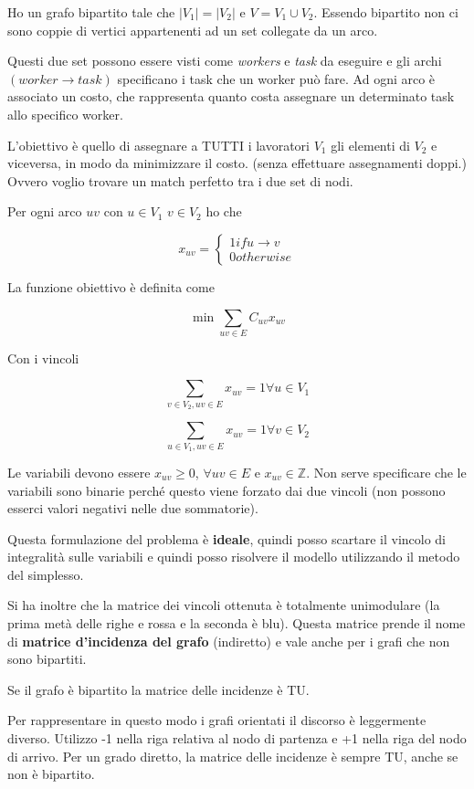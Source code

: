 Ho un grafo bipartito tale che $|V_1| = |V_2|$ e $V = V_1 \cup V_2$. Essendo bipartito non ci sono coppie di vertici appartenenti ad un set collegate da un arco.

Questi due set possono essere visti come \textit{workers} e \textit{task} da eseguire e gli archi $(worker \to task)$ specificano i task che un worker può fare. Ad ogni arco è associato un costo, che rappresenta quanto costa assegnare un determinato task allo specifico worker.

L'obiettivo è quello di assegnare a TUTTI i lavoratori $V_1$ gli elementi di $V_2$  e viceversa, in modo da minimizzare il costo. (senza effettuare assegnamenti doppi.) Ovvero voglio trovare un match perfetto tra i due set di nodi.

Per ogni arco $uv$ con $u \in V_1$ $v \in V_2$ ho che 

$$
x_{uv} = \begin{cases}
1 if u \to v\\
0 otherwise
\end{cases}
$$

La funzione obiettivo è definita come

$$
\min \sum_{uv \in E} C_{uv}x_{uv}
$$

Con i vincoli

$$
\sum_{v \in V_2, uv \in E} x_{uv} = 1 \forall u \in V_1
$$

$$
\sum_{u \in V_1, uv \in E} x_{uv} = 1 \forall v \in V_2
$$

Le variabili devono essere $x_{uv} \geq 0$, $\forall uv \in E$ e $x_{uv} \in \mathbb{Z}$. Non serve specificare che le variabili sono binarie perché questo viene forzato dai due vincoli (non possono esserci valori negativi nelle due sommatorie).

Questa formulazione del problema è \textbf{ideale}, quindi posso scartare il vincolo di integralità sulle variabili e quindi posso risolvere il modello utilizzando il metodo del simplesso.

Si ha inoltre che la matrice dei vincoli ottenuta è totalmente unimodulare (la prima metà delle righe e rossa e la seconda è blu). Questa matrice prende il nome di \textbf{matrice d'incidenza del grafo} (indiretto) e vale anche per i grafi che non sono bipartiti.

Se il grafo è bipartito la matrice delle incidenze è TU.

Per rappresentare in questo modo i grafi orientati il discorso è leggermente diverso. Utilizzo -1 nella riga relativa al nodo di partenza e +1 nella riga del nodo di arrivo.
Per un grado diretto, la matrice delle incidenze è sempre TU, anche se non è bipartito.















